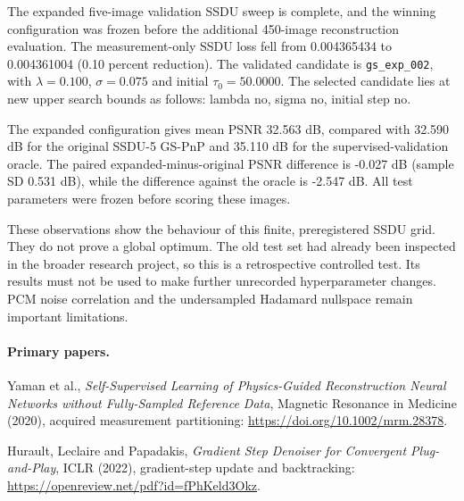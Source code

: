 \documentclass[10pt,a4paper]{article}
\begin{document}
The expanded five-image validation SSDU sweep is complete,
and the winning configuration was frozen before the additional
450-image reconstruction evaluation.
The measurement-only SSDU loss fell from 0.004365434 to
0.004361004 (0.10 percent reduction).
The validated candidate is \texttt{gs\_exp\_002}, with
$\lambda=0.100$, $\sigma=0.075$ and
initial $\tau_0=50.0000$.
The selected candidate lies at new upper search bounds
as follows: lambda no, sigma no,
initial step no.

The expanded configuration gives mean PSNR 32.563 dB, compared with 32.590 dB for the original SSDU-5 GS-PnP and 35.110 dB for the supervised-validation oracle. The paired expanded-minus-original PSNR difference is -0.027 dB (sample SD 0.531 dB), while the difference against the oracle is -2.547 dB. All test parameters were frozen before scoring these images.

These observations show the behaviour of this finite,
preregistered SSDU grid. They do not prove a global optimum.
The old test set had already been inspected in the broader
research project, so this is a retrospective controlled test.
Its results must not be used to make further unrecorded
hyperparameter changes. PCM noise correlation and the
undersampled Hadamard nullspace remain important limitations.

\paragraph{Primary papers.}
Yaman et al., \emph{Self-Supervised Learning of
Physics-Guided Reconstruction Neural Networks without
Fully-Sampled Reference Data}, Magnetic Resonance in Medicine
(2020), acquired measurement partitioning:
\url{https://doi.org/10.1002/mrm.28378}.

Hurault, Leclaire and Papadakis,
\emph{Gradient Step Denoiser for Convergent Plug-and-Play},
ICLR (2022), gradient-step update and backtracking:
\url{https://openreview.net/pdf?id=fPhKeld3Okz}.
\end{document}
